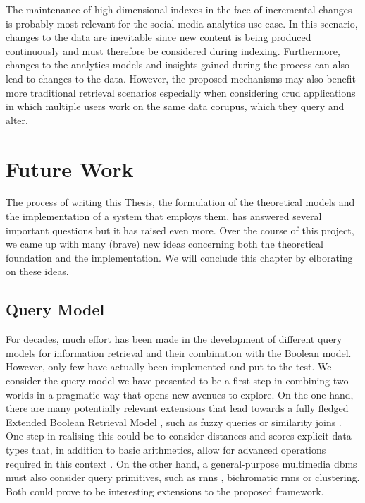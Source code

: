 The maintenance of high-dimensional indexes in the face of incremental changes is probably most relevant for the social media analytics use case. In this scenario, changes to the data are inevitable since new content is being produced continuously and must therefore be considered during indexing. Furthermore, changes to the analytics models and insights gained during the process can also lead to changes to the data. However, the proposed mechanisms may also benefit more traditional retrieval scenarios especially when considering \acrshort{crud} applications in which multiple users work on the same data corupus, which they query and alter.

\section{Future Work}

The process of writing this Thesis, the formulation of the theoretical models and the implementation of a system that employs them, has answered several important questions but it has raised even more. Over the course of this project, we came up with many (brave) new ideas concerning both the theoretical foundation and the implementation. We will conclude this chapter by elborating on these ideas.

\subsection{Query Model}

For decades, much effort has been made in the development of different query models for information retrieval and their combination with the Boolean model. However, only few have actually been implemented and put to the test. We consider the query model we have presented to be a first step in combining two worlds in a pragmatic way that opens new avenues to explore. On the one hand, there are many potentially relevant extensions that lead towards a fully fledged Extended Boolean Retrieval Model \cite{Salton:1983Extended}, such as fuzzy queries \cite{Umano:1983Retrieval,Bohm:2001Fast} or similarity joins \cite{Yao:2010K}. One step in realising this could be to consider distances and scores explicit data types that, in addition to basic arithmetics, allow for advanced operations required in this context \cite{Silva:2010SimDB}. On the other hand, a general-purpose multimedia \acrshort{dbms} must also consider query primitives, such as \acrshort{rnns} \cite{Korn:2000Influence}, bichromatic \acrshort{rnns} \cite{Stanoi:2001Discovery} or clustering. Both could prove to be interesting extensions to the proposed framework.

